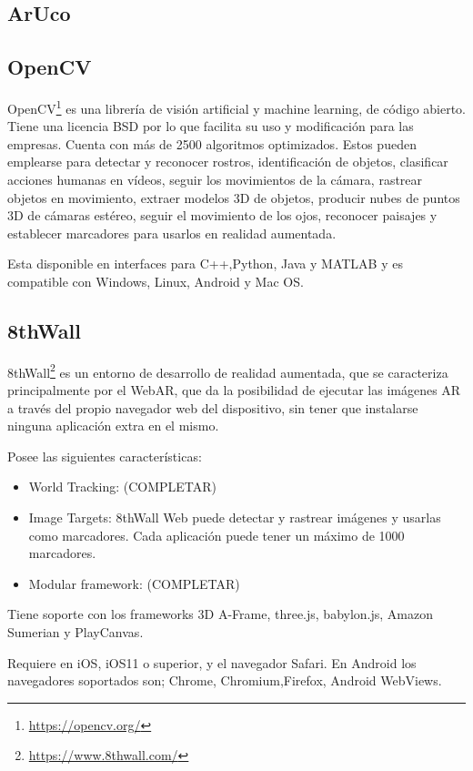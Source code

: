 \subsection{ArUco}


\subsection{OpenCV}
OpenCV\footnote{\url{https://opencv.org/}} es una librería de visión artificial y machine learning, de código abierto. Tiene una licencia BSD por lo que facilita su uso y modificación para las empresas. Cuenta con más de 2500 algoritmos optimizados. Estos pueden emplearse para detectar y reconocer rostros, identificación de objetos, clasificar acciones humanas en vídeos, seguir los movimientos de la cámara, rastrear objetos en movimiento, extraer modelos 3D de objetos, producir nubes de puntos 3D de cámaras estéreo, seguir el movimiento de los ojos, reconocer paisajes y establecer marcadores para usarlos en realidad aumentada.

Esta disponible en interfaces para C++,Python, Java y MATLAB y es compatible con Windows, Linux, Android y Mac OS.


\subsection{8thWall}
8thWall\footnote{\url{https://www.8thwall.com/}}
es un entorno de desarrollo de realidad aumentada, que se caracteriza principalmente por el WebAR, que da la posibilidad de ejecutar las imágenes AR a través del propio navegador web del dispositivo, sin tener que instalarse ninguna aplicación extra en el mismo\cite{8thwall_products}.

Posee las siguientes características:
\begin{itemize}
	\item World Tracking: (COMPLETAR)
	\item Image Targets: 8thWall Web puede detectar y rastrear imágenes y usarlas como marcadores. Cada aplicación puede tener un máximo de 1000 marcadores.
	\item Modular framework: (COMPLETAR)
\end{itemize}


Tiene soporte con los frameworks 3D A-Frame, three.js, babylon.js, Amazon Sumerian y PlayCanvas.

Requiere en iOS, iOS11 o superior, y el navegador Safari. En Android los navegadores soportados son; Chrome, Chromium,Firefox, Android WebViews.

